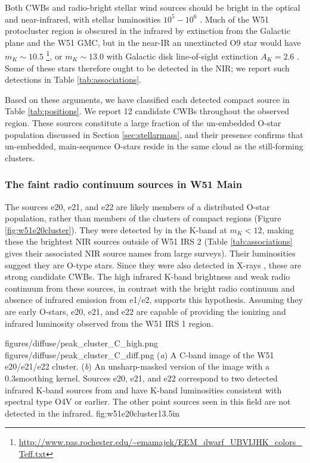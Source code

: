 Both CWBs and radio-bright stellar wind sources should be bright in the
optical and near-infrared, with stellar luminosities $10^5-10^6$ \lsun.
Much of the W51 protocluster region is obscured in the infrared by extinction
from the Galactic plane and the W51 GMC, but in the near-IR an unextincted O9
star would have
$m_K\sim10.5$
\citep{Pecaut2013a}\footnote{\url{http://www.pas.rochester.edu/~emamajek/EEM_dwarf_UBVIJHK_colors_Teff.txt}},
or $m_K\sim 13.0$ with Galactic disk line-of-sight extinction $A_K=2.6$
\citep{Goldader1994a}.  Some of these stars therefore ought to be detected in
the NIR; we report such detections in Table \ref{tab:associations}.

Based on these arguments, we have classified each detected compact source in
Table \ref{tab:positions}.  We report 12 candidate CWBs throughout the observed
region.  These sources constitute a large fraction of the un-embedded O-star
population discussed in Section \ref{sec:stellarmass}, and their presence confirms
that un-embedded, main-sequence O-stars reside in the same cloud as the still-forming
clusters.

\subsubsection{The faint radio continuum sources in W51 Main}

The sources e20, e21, and e22 are likely members of a distributed O-star
population, rather than members of the clusters of compact \hii regions (Figure
\ref{fig:w51e20cluster}).  They were detected by \citet{Goldader1994a} in the
K-band at $m_K < 12$, making these the brightest NIR sources outside of W51
IRS 2 (Table \ref{tab:associations} gives their associated NIR source names
from large surveys).  Their luminosities suggest they are O-type stars.  Since
they were also detected in X-rays \citep{Townsley2014a}, these are strong
candidate CWBs.  The high infrared K-band brightness and weak radio
continuum from these sources, in contrast with the bright radio continuum and
absence of infrared emission from e1/e2, supports this hypothesis.  
Assuming they are early O-stars, e20, e21, and e22 are capable of providing the
ionizing and infrared luminosity observed from the W51 IRS 1 \hii region.

\FigureTwo
{figures/diffuse/peak_cluster_C_high.png}
{figures/diffuse/peak_cluster_C_diff.png}
{({\it a}) A C-band image of the W51 e20/e21/e22 cluster.
({\it b}) An unsharp-masked version of the image with a 0.3\arcsec smoothing
kernel. 
Sources e20, e21, and e22 correspond to two detected infrared K-band sources from
\citet[][Table \ref{tab:associations}]{Goldader1994a} and have K-band
luminosities consistent with spectral type O4V or earlier.  The other point
sources seen in this field are not detected in the infrared.
}
{fig:w51e20cluster}{1}{3.5in}


